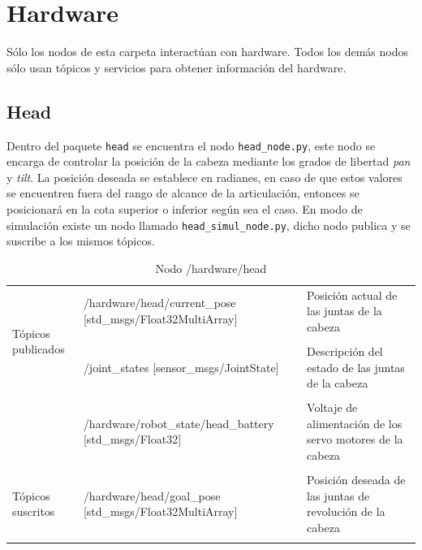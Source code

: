 \documentclass[a4paper,usenames,dvipsnames,svgnames,table]{book}
\begin{document}
\section{Hardware}
Sólo los nodos de esta carpeta interactúan con hardware. Todos los demás nodos sólo usan tópicos y servicios para obtener información del hardware.

\subsection{Head}
Dentro del paquete \texttt{head} se encuentra el nodo \texttt{head\_node.py}, este nodo se encarga de controlar la posición de la cabeza mediante los grados de libertad \textit{pan} y \textit{tilt}. La posición deseada se establece en radianes, en caso de que estos valores se encuentren fuera del rango de alcance de la articulación, entonces  se posicionará en la cota superior o inferior según sea el caso. En modo de simulación existe un nodo llamado \texttt{head\_simul\_node.py}, dicho nodo publica y se suscribe a los mismos tópicos.

\begin{table}[H]
\begin{center}
\begin{tabular}{|l|p{6.5cm}|p{4.5cm}|}%
\hline

\multirow{4}{*}{Tópicos publicados} 
&  /hardware/head/current\_pose [std\_msgs/Float32MultiArray]  & Posición actual de las juntas de la cabeza \\
& & \\
& /joint\_states [sensor\_msgs/JointState] & Descripción del estado de las juntas de la cabeza \\
& & \\
& /hardware/robot\_state/head\_battery [std\_msgs/Float32]  & Voltaje de alimentación de los servo motores de la cabeza\\ 
& & \\
\cline{1-3}

Tópicos suscritos &  /hardware/head/goal\_pose [std\_msgs/Float32MultiArray] & Posición deseada de las juntas de revolución de la cabeza \\ 
& & \\
\hline

\end{tabular}
\caption{Nodo /hardware/head}
\label{head node}
\end{center}
\end{table}
\end{document}
